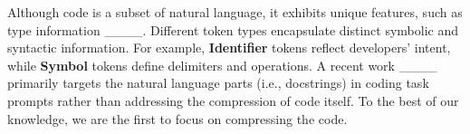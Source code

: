 

Although code is a subset of natural language, it exhibits unique features, such as type information ____. Different token types encapsulate distinct symbolic and syntactic information. For example, \textbf{Identifier} tokens reflect developers’ intent, while \textbf{Symbol} tokens define delimiters and operations. A recent work ____ primarily targets the natural language parts (i.e., docstrings) in coding task prompts rather than addressing the compression of code itself. To the best of our knowledge, we are the first to focus on compressing the code.

